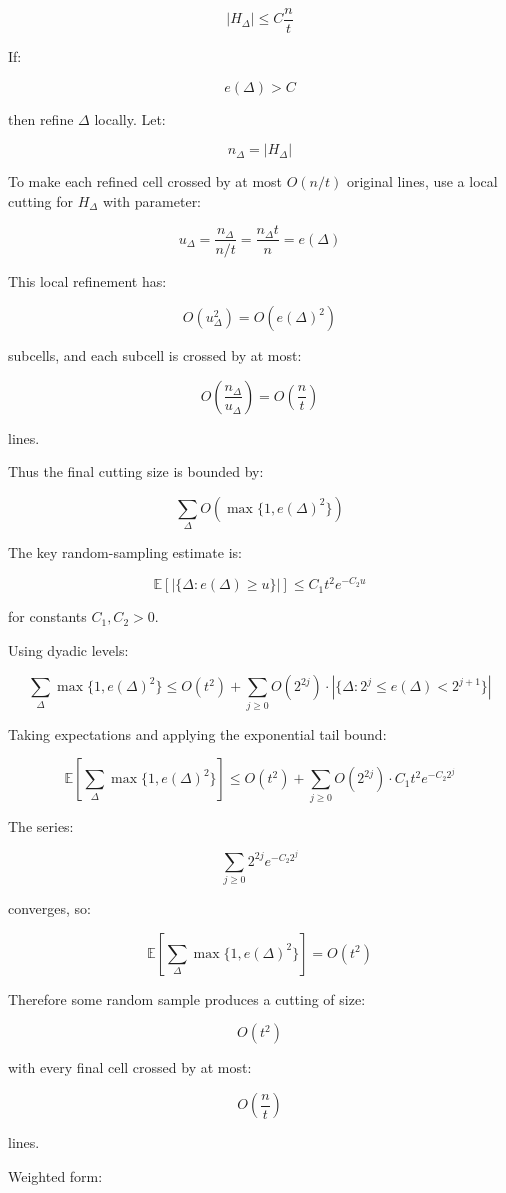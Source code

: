 \documentclass[
  11pt,
]{article}
\begin{document}
\[
|H_\Delta|\le C\frac nt
\]

If:

\[
e(\Delta)>C
\]

then refine \(\Delta\) locally. Let:

\[
n_\Delta=|H_\Delta|
\]

To make each refined cell crossed by at most \(O(n/t)\) original lines,
use a local cutting for \(H_\Delta\) with parameter:

\[
u_\Delta=\frac{n_\Delta}{n/t}=\frac{n_\Delta t}{n}=e(\Delta)
\]

This local refinement has:

\[
O(u_\Delta^2)=O(e(\Delta)^2)
\]

subcells, and each subcell is crossed by at most:

\[
O\left(\frac{n_\Delta}{u_\Delta}\right)=O\left(\frac nt\right)
\]

lines.

Thus the final cutting size is bounded by:

\[
\sum_{\Delta}O\left(\max\{1,e(\Delta)^2\}\right)
\]

The key random-sampling estimate is:

\[
\mathbb E\left[|\{\Delta:e(\Delta)\ge u\}|\right]\le C_1t^2e^{-C_2u}
\]

for constants \(C_1,C_2>0\).

Using dyadic levels:

\[
\sum_{\Delta}\max\{1,e(\Delta)^2\}\le O(t^2)+\sum_{j\ge 0}O(2^{2j})\cdot|\{\Delta:2^j\le e(\Delta)<2^{j+1}\}|
\]

Taking expectations and applying the exponential tail bound:

\[
\mathbb E\left[\sum_{\Delta}\max\{1,e(\Delta)^2\}\right]\le O(t^2)+\sum_{j\ge 0}O(2^{2j})\cdot C_1t^2e^{-C_2 2^j}
\]

The series:

\[
\sum_{j\ge 0}2^{2j}e^{-C_2 2^j}
\]

converges, so:

\[
\mathbb E\left[\sum_{\Delta}\max\{1,e(\Delta)^2\}\right]=O(t^2)
\]

Therefore some random sample produces a cutting of size:

\[
O(t^2)
\]

with every final cell crossed by at most:

\[
O\left(\frac nt\right)
\]

lines.

Weighted form:
\end{document}
